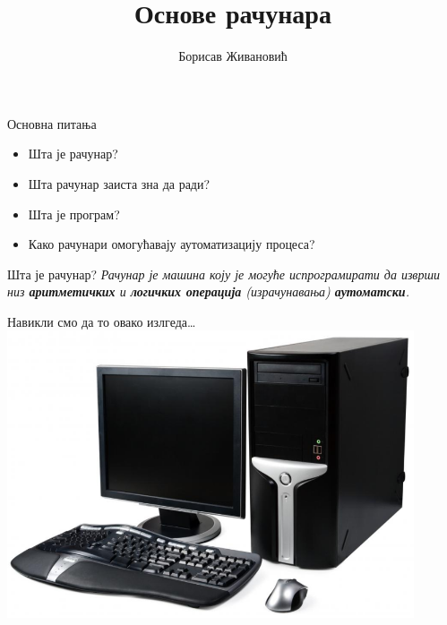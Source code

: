 \documentclass[xcolor=table]{beamer}
\title{Основе рачунара}
\author{Борисав Живановић}
\date{}
\begin{document}
    \begin{frame}
        \maketitle
    \end{frame}
    
    \begin{frame}{Основна питања}
        \begin{itemize}
            \item Шта је рачунар?
            \item Шта рачунар заиста зна да ради?
            \item Шта је програм?
            \item Како рачунари омогућавају аутоматизацију процеса?
        \end{itemize}
    \end{frame}
    
    \begin{frame}{Шта је рачунар?}
        \textit{Рачунар је машина коју је могуће испрограмирати да изврши низ \textbf{аритметичких} и \textbf{логичких операција} (израчунавања) \textbf{аутоматски}.}
    \end{frame}
    
    \begin{frame}{Навикли смо да то овако излгеда…}
        \centering
        \includegraphics[height=0.8\textheight,width=0.9\textwidth,keepaspectratio]{images/desktop.png}
    \end{frame}
    
\end{document}
